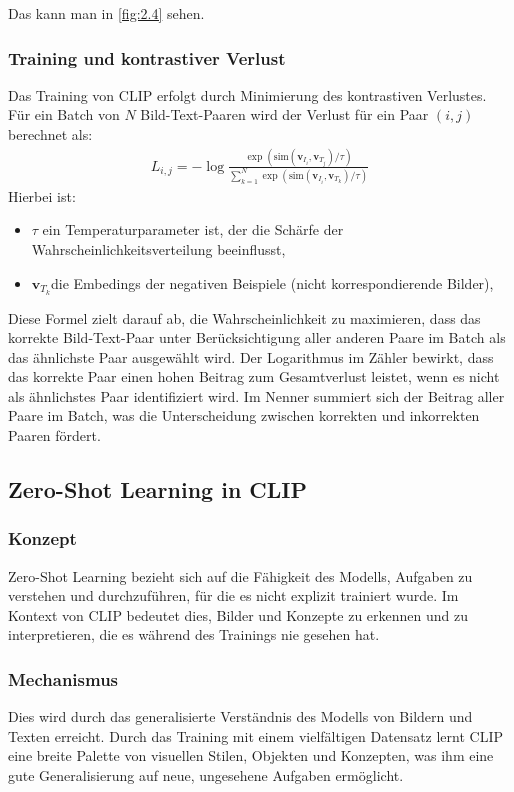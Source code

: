 \documentclass[nolibertine, ngerman, algorithm, nomencl, minted]{ttlab-qualify}
\begin{document}
Das kann man in \ref{fig:2.4} sehen.
\subsubsection{Training und kontrastiver Verlust}
Das Training von CLIP erfolgt durch Minimierung des kontrastiven Verlustes. Für ein Batch von \( N \) Bild-Text-Paaren wird der Verlust für ein Paar \( (i, j) \) berechnet als:
\begin{align*}
L_{i,j} = -\log \frac{\exp(\text{sim}(\textbf{v}_{I_i}, \textbf{v}_{T_j}) / \tau)}{\sum_{k=1}^{N} \exp(\text{sim}(\textbf{v}_{I_i}, \textbf{v}_{T_k}) / \tau)}
\end{align*}
Hierbei ist:
\begin{itemize}
 \item \( \tau \) ein Temperaturparameter ist, der die Schärfe der Wahrscheinlichkeitsverteilung beeinflusst,
 \item \(\textbf{v}_{T_k}\)die Embedings der negativen Beispiele (nicht korrespondierende Bilder),
\end{itemize}

Diese Formel zielt darauf ab, die Wahrscheinlichkeit zu maximieren, dass das korrekte Bild-Text-Paar unter Berücksichtigung aller anderen Paare im Batch als das ähnlichste Paar ausgewählt wird. Der Logarithmus im Zähler bewirkt, dass das korrekte Paar einen hohen Beitrag zum Gesamtverlust leistet, wenn es nicht als ähnlichstes Paar identifiziert wird. Im Nenner summiert sich der Beitrag aller Paare im Batch, was die Unterscheidung zwischen korrekten und inkorrekten Paaren fördert.

\subsection{Zero-Shot Learning in CLIP}
\subsubsection{Konzept}
Zero-Shot Learning bezieht sich auf die Fähigkeit des Modells,
Aufgaben zu verstehen und durchzuführen, für die es nicht 
explizit trainiert wurde. Im Kontext von CLIP bedeutet dies, 
Bilder und Konzepte zu erkennen und zu interpretieren, 
die es während des Trainings nie gesehen hat.

\subsubsection{Mechanismus}
Dies wird durch das generalisierte Verständnis des Modells von Bildern und Texten 
erreicht. Durch das Training mit einem vielfältigen Datensatz lernt CLIP eine breite 
Palette von visuellen Stilen, Objekten und Konzepten, was ihm eine gute Generalisierung 
auf neue, ungesehene Aufgaben ermöglicht.
\end{document}
